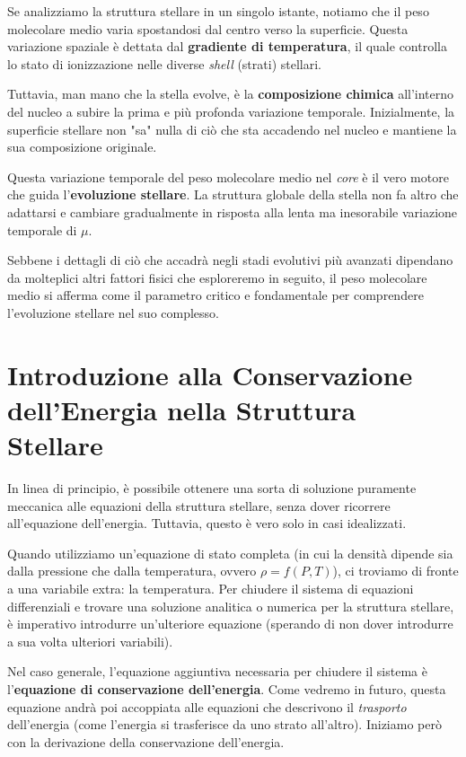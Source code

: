 Se analizziamo la struttura stellare in un singolo istante, notiamo che il peso molecolare medio varia spostandosi dal centro verso la superficie. Questa variazione spaziale è dettata dal \textbf{gradiente di temperatura}, il quale controlla lo stato di ionizzazione nelle diverse \textit{shell} (strati) stellari.

Tuttavia, man mano che la stella evolve, è la \textbf{composizione chimica} all'interno del nucleo a subire la prima e più profonda variazione temporale. Inizialmente, la superficie stellare non "sa" nulla di ciò che sta accadendo nel nucleo e mantiene la sua composizione originale.

Questa variazione temporale del peso molecolare medio nel \textit{core} è il vero motore che guida l'\textbf{evoluzione stellare}. La struttura globale della stella non fa altro che adattarsi e cambiare gradualmente in risposta alla lenta ma inesorabile variazione temporale di $\mu$.

Sebbene i dettagli di ciò che accadrà negli stadi evolutivi più avanzati dipendano da molteplici altri fattori fisici che esploreremo in seguito, il peso molecolare medio si afferma come il parametro critico e fondamentale per comprendere l'evoluzione stellare nel suo complesso.

\section{Introduzione alla Conservazione dell'Energia nella Struttura Stellare}

In linea di principio, è possibile ottenere una sorta di soluzione puramente meccanica alle equazioni della struttura stellare, senza dover ricorrere all'equazione dell'energia. Tuttavia, questo è vero solo in casi idealizzati.

Quando utilizziamo un'equazione di stato completa (in cui la densità dipende sia dalla pressione che dalla temperatura, ovvero $\rho = f(P, T)$), ci troviamo di fronte a una variabile extra: la temperatura. Per chiudere il sistema di equazioni differenziali e trovare una soluzione analitica o numerica per la struttura stellare, è imperativo introdurre un'ulteriore equazione (sperando di non dover introdurre a sua volta ulteriori variabili).

Nel caso generale, l'equazione aggiuntiva necessaria per chiudere il sistema è l'\textbf{equazione di conservazione dell'energia}. Come vedremo in futuro, questa equazione andrà poi accoppiata alle equazioni che descrivono il \textit{trasporto} dell'energia (come l'energia si trasferisce da uno strato all'altro). Iniziamo però con la derivazione della conservazione dell'energia.

